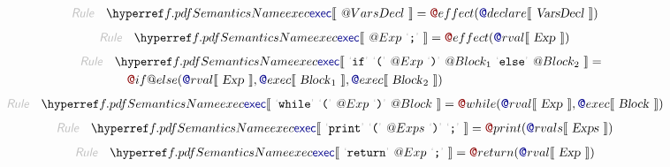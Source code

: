 \begin{align*}
  \KEY{Rule} \quad
    & \SEMREF{exec} \LEFTPHRASE \
                            \VAR@VarsDecl \
                          \RIGHTPHRASE  = 
      \FUN@effect
        (  \SEM@declare \LEFTPHRASE \
                        \VAR{VarsDecl} \
                      \RIGHTPHRASE  )
\end{align*}
\begin{align*}
  \KEY{Rule} \quad
    & \SEMREF{exec} \LEFTPHRASE \
                            \VAR@Exp \ \LEX{{;}} \
                          \RIGHTPHRASE  = 
      \FUN@effect
        (  \SEM@rval \LEFTPHRASE \
                        \VAR{Exp} \
                      \RIGHTPHRASE  )
\end{align*}
\begin{align*}
  \KEY{Rule} \quad
    & \SEMREF{exec} \LEFTPHRASE \
                            \LEX{if} \ \LEX{{(}} \ \VAR@Exp \ \LEX{{)}} \ \VAR@Block\SUB{1} \ \LEX{else} \ \VAR@Block\SUB{2} \
                          \RIGHTPHRASE  = \\&\quad
      \FUN@if@else
        (  \SEM@rval \LEFTPHRASE \
                        \VAR{Exp} \
                      \RIGHTPHRASE , 
               \SEM@exec \LEFTPHRASE \
                        \VAR{Block}\SUB{1} \
                      \RIGHTPHRASE , 
               \SEM@exec \LEFTPHRASE \
                        \VAR{Block}\SUB{2} \
                      \RIGHTPHRASE  )
\end{align*}
\begin{align*}
  \KEY{Rule} \quad
    & \SEMREF{exec} \LEFTPHRASE \
                            \LEX{while} \ \LEX{{(}} \ \VAR@Exp \ \LEX{{)}} \ \VAR@Block \
                          \RIGHTPHRASE  = 
      \FUN@while
        (  \SEM@rval \LEFTPHRASE \
                        \VAR{Exp} \
                      \RIGHTPHRASE , 
               \SEM@exec \LEFTPHRASE \
                        \VAR{Block} \
                      \RIGHTPHRASE  )
\end{align*}
\begin{align*}
  \KEY{Rule} \quad
    & \SEMREF{exec} \LEFTPHRASE \
                            \LEX{print} \ \LEX{{(}} \ \VAR@Exps \ \LEX{{)}} \ \LEX{{;}} \
                          \RIGHTPHRASE  = 
      \FUN@print
        (  \SEM@rvals \LEFTPHRASE \
                        \VAR{Exps} \
                      \RIGHTPHRASE  )
\end{align*}
\begin{align*}
  \KEY{Rule} \quad
    & \SEMREF{exec} \LEFTPHRASE \
                            \LEX{return} \ \VAR@Exp \ \LEX{{;}} \
                          \RIGHTPHRASE  = 
      \FUN@return
        (  \SEM@rval \LEFTPHRASE \
                        \VAR{Exp} \
                      \RIGHTPHRASE  )
\end{align*}
